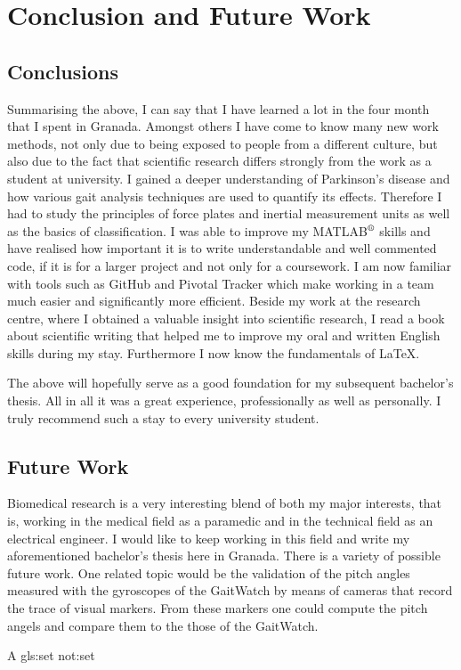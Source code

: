 \chapter{Conclusion and Future Work}
\label{ch:Conclusion and Future Work}

\section{Conclusions}

Summarising the above, I can say that I have learned a lot in the four month that I spent in Granada. Amongst others I have come to know many new work methods, not only due to being exposed to people from a different culture, but also due to the fact that scientific research differs strongly from the work as a student at university. I gained a deeper understanding of Parkinson's disease and how various gait analysis techniques are used to quantify its effects. Therefore I had to study the principles of force plates and inertial measurement units as well as the basics of classification. I was able to improve my MATLAB$\textsuperscript{\textregistered}$ skills and have realised how important it is to write understandable and well commented code, if it is for a larger project and not only for a coursework. I am now familiar with tools such as GitHub and Pivotal Tracker which make working in a team much easier and significantly more efficient.  Beside my work at the research centre, where I obtained a valuable insight into scientific research, I read a book about scientific writing that helped me to improve my oral and written English skills during my stay. Furthermore I now know the fundamentals of \LaTeX{}.

The above will hopefully serve as a good foundation for my subsequent bachelor's thesis.  All in all it was a great experience, professionally as well as personally. I truly recommend such a stay to every university student.

\section{Future Work}

Biomedical research is a very interesting blend of both my major interests, that is, working in the medical field as a paramedic and  in the technical field as an electrical engineer. I would like to keep working in this field and write my aforementioned bachelor's thesis here in Granada. There is a variety of possible future work. One related topic would be the validation of the pitch angles measured with the gyroscopes of the GaitWatch by means of cameras that record the trace of visual markers. From these markers one could compute the pitch angels and compare them to the those of the GaitWatch. 

A \gls{gls:set} \gls{not:set}